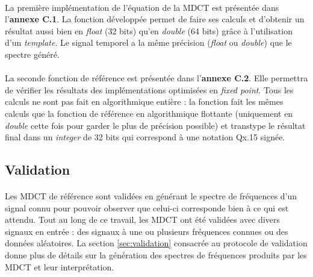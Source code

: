 \documentclass{article}
\begin{document}
    \paragraph{}
    La première implémentation de l'équation de la MDCT est présentée dans l'\textbf{annexe C.1}. La fonction développée permet de faire ses calculs et d'obtenir un résultat aussi bien en \emph{float} (32 bits) qu'en \emph{double} (64 bits) grâce à l'utilisation d'un \emph{template}. Le signal temporel a la même précision (\emph{float} ou \emph{double}) que le spectre généré.

    \paragraph{}
    La seconde fonction de référence est présentée dans l'\textbf{annexe C.2}. Elle permettra de vérifier les résultats des implémentations optimisées en \emph{fixed point}. Tous les calculs ne sont pas fait en algorithmique entière : la fonction fait les mêmes calculs que la fonction de référence en algorithmique flottante (uniquement en \emph{double} cette fois pour garder le plus de précision possible) et transtype le résultat final dans un \emph{integer} de 32 bits qui correspond à une notation Qx.15 signée.


    \subsection{Validation}
    \paragraph{}
    Les MDCT de référence sont validées en générant le spectre de fréquences d'un signal connu pour pouvoir observer que celui-ci corresponde bien à ce qui est attendu. Tout au long de ce travail, les MDCT ont été validées avec divers signaux en entrée : des signaux à une ou plusieurs fréquences connues ou des données aléatoires. La section \ref{sec:validation} consacrée au protocole de validation donne plus de détails sur la génération des spectres de fréquences produits par les MDCT et leur interprétation. 
\end{document}
